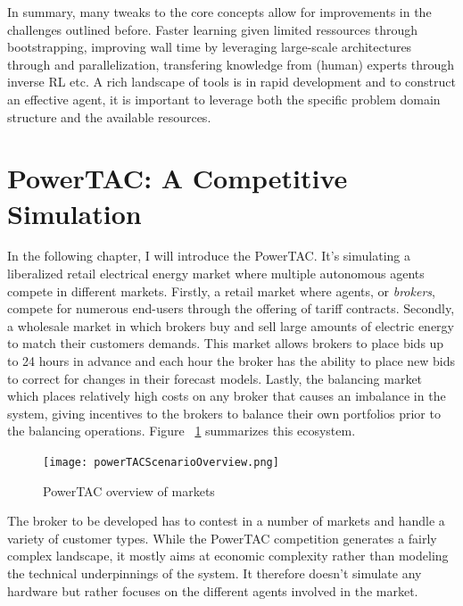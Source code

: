 In summary, many tweaks to the core concepts allow for improvements in the challenges outlined before. Faster learning given limited
ressources through bootstrapping, improving wall time by leveraging large-scale architectures through and
parallelization, transfering knowledge from (human) experts through inverse \ac {RL} etc. A rich landscape of tools is
in rapid development and to construct an effective agent, it is important to leverage both the specific problem domain
structure and the available resources. 



\section{PowerTAC: A Competitive Simulation}

In the following chapter, I will introduce the \acf{PowerTAC}. It's simulating a liberalized retail electrical energy
market where multiple autonomous agents compete in different markets. Firstly, a retail market where agents, or
\emph{brokers}, compete for numerous end-users through the offering of tariff contracts. Secondly, a wholesale market in
which brokers buy and sell large amounts of electric energy to match their customers demands. This market allows brokers
to place bids up to 24 hours in advance and each hour the broker has the ability to place new bids to correct for
changes in their forecast models. Lastly, the balancing market which places relatively high costs on any broker that
causes an imbalance in the system, giving incentives to the brokers to balance their own portfolios prior to the
balancing operations. Figure ~\ref{fig:powertacoverview} summarizes this ecosystem.


\begin{figure}[!h]%
    \texttt{[image: powerTACScenarioOverview.png]} \caption{PowerTAC overview of markets}
\label{fig:powertacoverview} \end{figure}


The broker to be developed has to contest in a number of markets and handle a variety of customer types. While the
\ac{PowerTAC} competition generates a fairly complex landscape, it mostly aims at economic complexity rather than
modeling the technical underpinnings of the system. It therefore doesn't simulate any hardware but rather focuses on the
different agents involved in the market.

